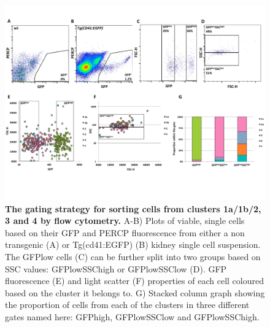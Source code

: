 \begin{figure}
    \centering
    \includegraphics[width=\textwidth]{"SF4"}
    \caption[The gating strategy for sorting cells from clusters 1a/1b/2, 3 and 4 by flow cytometry]{\textbf{The gating strategy for sorting cells from clusters 1a/1b/2, 3 and 4 by flow cytometry.} A-B) Plots of viable, single cells based on their GFP and PERCP fluorescence from either a non transgenic (A) or Tg(cd41:EGFP) (B) kidney single cell suspension. The GFPlow cells (C) can be further split into two groups based on SSC values: GFPlowSSChigh or GFPlowSSClow (D). GFP fluorescence (E) and light scatter (F) properties of each cell coloured based on the cluster it belongs to. G) Stacked column graph showing the proportion of cells from each of the clusters in three different gates named here: GFPhigh, GFPlowSSClow and GFPlowSSChigh.}
    \label{fig:newgate}
\end{figure}

